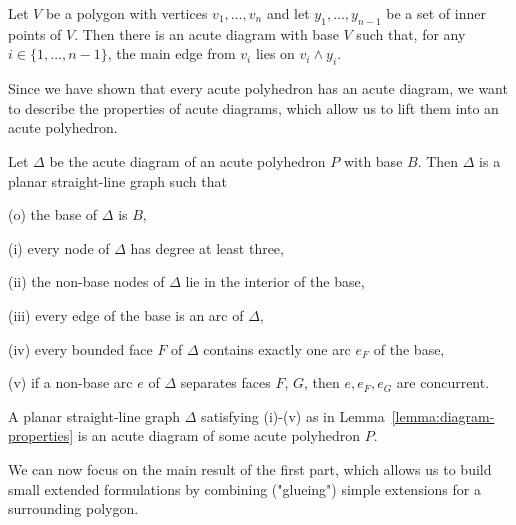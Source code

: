 \begin{corollary}\label{corollary:acute-direction}
  Let $V$ be a polygon with vertices $v_1,\dots,v_n$ and let $y_1,\dots,y_{n-1}$ be a set of inner points of $V$.
  Then there is an acute diagram with base $V$ such that, for any $i \in \{1,\dots,n-1\}$, the main edge from $v_i$ lies on $v_i \wedge y_i$.
\end{corollary}

Since we have shown that every acute polyhedron has an acute diagram, we want to describe the properties of acute diagrams, which allow us to lift them into an acute polyhedron.

\begin{lemma}\label{lemma:diagram-properties}
  Let $\Delta$ be the acute diagram of an acute polyhedron $P$ with base $B$.
  Then $\Delta$ is a planar straight-line graph such that

  (o) the base of $\Delta$ is $B$,
  
  (i) every node of $\Delta$ has degree at least three,

  (ii) the non-base nodes of $\Delta$ lie in the interior of the base,

  (iii) every edge of the base is an arc of $\Delta$,

  (iv) every bounded face $F$ of $\Delta$ contains exactly one arc $e_F$ of the base,

  (v) if a non-base arc $e$ of $\Delta$ separates faces $F$, $G$, then $e, e_F, e_G$ are concurrent.
\end{lemma}


\begin{lemma}
  A planar straight-line graph $\Delta$ satisfying (i)-(v) as in Lemma~\ref{lemma:diagram-properties} is an acute diagram of some acute polyhedron $P$.
\end{lemma}

We can now focus on the main result of the first part, which allows us to build small extended formulations by combining ("glueing") simple extensions for a surrounding polygon.

